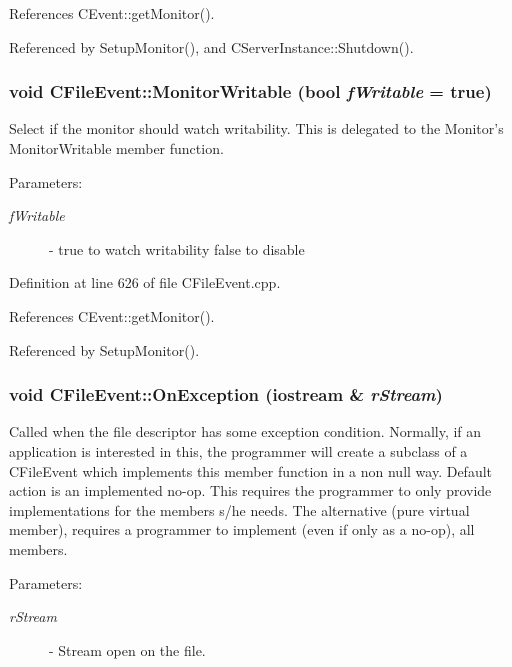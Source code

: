 References CEvent::get\-Monitor().

Referenced by Setup\-Monitor(), and CServer\-Instance::Shutdown().
\subsubsection{\setlength{\rightskip}{0pt plus 5cm}void CFile\-Event::Monitor\-Writable (bool {\em f\-Writable} = true)}\label{classCFileEvent_a13}


Select if the monitor should watch writability. This is delegated to the Monitor's Monitor\-Writable member function. \begin{Desc}
\item[Parameters: ]\par
\begin{description}
\item[{\em 
f\-Writable}]- true to watch writability false to disable \end{description}
\end{Desc}


Definition at line 626 of file CFile\-Event.cpp.

References CEvent::get\-Monitor().

Referenced by Setup\-Monitor().
\subsubsection{\setlength{\rightskip}{0pt plus 5cm}void CFile\-Event::On\-Exception (iostream \& {\em r\-Stream})\hspace{0.3cm}{\tt  [virtual]}}\label{classCFileEvent_a17}


Called when the file descriptor has some exception condition.  Normally, if an application is interested in this, the programmer will create a  subclass of a CFile\-Event which implements this member function in a non null way. Default action is an implemented no-op. This requires the programmer to only provide implementations for the members s/he needs. The alternative (pure virtual member), requires a programmer to implement (even if only as a no-op), all members. \begin{Desc}
\item[Parameters: ]\par
\begin{description}
\item[{\em 
r\-Stream}]- Stream open on the file. \end{description}
\end{Desc}


